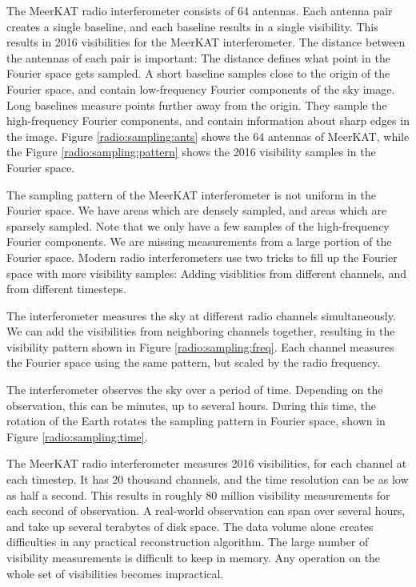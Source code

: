 The MeerKAT radio interferometer consists of 64 antennas. Each antenna pair creates a single baseline, and each baseline results in a single visibility. This results in 2016 visibilities for the MeerKAT interferometer. The distance between the antennas of each pair is important: The distance defines what point in the Fourier space gets sampled. A short baseline samples close to the origin of the Fourier space, and contain low-frequency Fourier components of the sky image. Long baselines measure points further away from the origin. They sample the high-frequency Fourier components, and contain information about sharp edges in the image. Figure \ref{radio:sampling:ants} shows the 64 antennas of MeerKAT, while the Figure \ref{radio:sampling:pattern} shows the 2016 visibility samples in the Fourier space.


The sampling pattern of the MeerKAT interferometer is not uniform in the Fourier space. We have areas which are densely sampled, and areas which are sparsely sampled. Note that we only have a few samples of the high-frequency Fourier components. We are missing measurements from a large portion of the Fourier space. Modern radio interferometers use two tricks to fill up the Fourier space with more visibility samples: Adding visiblities from different channels, and from different timesteps.

The interferometer measures the sky at different radio channels simultaneously. We can add the visibilities from neighboring channels together, resulting in the visibility pattern shown in Figure \ref{radio:sampling:freq}. Each channel measures the Fourier space using the same pattern, but scaled by the radio frequency.

The interferometer observes the sky over a period of time. Depending on the observation, this can be minutes, up to several hours. During this time, the rotation of the Earth rotates the sampling pattern in Fourier space, shown in Figure \ref{radio:sampling:time}.

The MeerKAT radio interferometer measures 2016 visibilities, for each channel at each timestep. It has 20 thousand channels, and the time resolution can be as low as half a second. This results in roughly 80 million visibility measurements for each second of observation. A real-world observation can span over several hours, and take up several terabytes of disk space. The data volume alone creates difficulties in any practical reconstruction algorithm. The large number of visibility measurements is difficult to keep in memory. Any operation on the whole set of visibilities becomes impractical.

